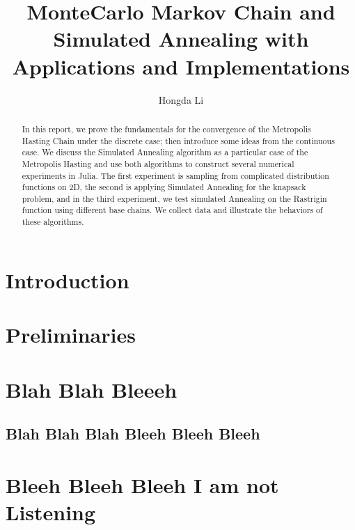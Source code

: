 \documentclass[]{article}
\title{MonteCarlo Markov Chain and Simulated Annealing with Applications and Implementations}
\author{Hongda Li}
\theoremstyle{definition}
\begin{document}
\maketitle
\begin{abstract}
    In this report, we prove the fundamentals for the convergence of the Metropolis Hasting Chain under the discrete case; then introduce some ideas from the continuous case. We discuss the Simulated Annealing algorithm as a particular case of the Metropolis Hasting and use both algorithms to construct several numerical experiments in Julia. The first experiment is sampling from complicated distribution functions on 2D, the second is applying Simulated Annealing for the knapsack problem, and in the third experiment, we test simulated Annealing on the Rastrigin function using different base chains. We collect data and illustrate the behaviors of these algorithms. 
\end{abstract}

\section{Introduction}
    

\section{Preliminaries}\label{sec:preliminaries}
    
\section{Blah Blah Bleeeh}
    \subsection{Blah Blah Blah Bleeh Bleeh Bleeh}
        

\appendix
\section{Bleeh Bleeh Bleeh I am not Listening}



\end{document}
